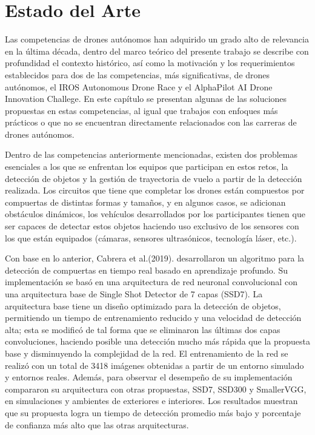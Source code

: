 \chapter{Estado del Arte}

Las competencias de drones autónomos han adquirido un grado alto de relevancia en la última década, dentro del marco teórico del presente trabajo se describe con profundidad el contexto histórico, así como la motivación y los requerimientos establecidos para dos de las competencias, más significativas, de drones autónomos, el  IROS Autonomous Drone Race y el AlphaPilot AI Drone Innovation Challege. 
En este capítulo se presentan algunas de las soluciones propuestas en estas competencias, al igual que trabajos con enfoques más prácticos o que no se encuentran directamente relacionados con las carreras de drones autónomos.

Dentro de las competencias anteriormente mencionadas, existen dos problemas esenciales a los que se enfrentan los equipos que participan en estos retos, la detección de objetos y la gestión de trayectoria de vuelo a partir de la detección realizada. 
Los circuitos que tiene que completar los drones están compuestos por compuertas de distintas formas y tamaños, y en algunos casos, se adicionan obstáculos dinámicos, los vehículos desarrollados por los participantes tienen que ser capaces de detectar estos objetos haciendo uso exclusivo de los sensores con los que están equipados (cámaras, sensores ultrasónicos, tecnología láser, etc.).

Con base en lo anterior, Cabrera et al.(2019). \cite{cabrera2019gate} desarrollaron un algoritmo para la detección de compuertas en tiempo real basado en aprendizaje profundo. Su implementación se basó en una arquitectura de red neuronal convolucional con una arquitectura base de Single Shot Detector de 7 capas (SSD7\cite{SSD7}). La arquitectura base tiene un diseño optimizado para la detección de objetos, permitiendo un tiempo de entrenamiento reducido y una velocidad de detección alta; esta se modificó de tal forma que se eliminaron las últimas dos capas convoluciones, haciendo posible una detección mucho más rápida que la propuesta base y disminuyendo la complejidad de la red. El entrenamiento de la red se realizó con un total de 3418 imágenes obtenidas a partir de un entorno simulado y entornos reales. 
Además, para observar el desempeño de su implementación compararon su arquitectura con otras propuestas, SSD7, SSD300 y SmallerVGG, en simulaciones y ambientes de exteriores e interiores. Los resultados muestran que su propuesta logra un tiempo de detección promedio más bajo y porcentaje de confianza más alto que las otras arquitecturas. 


